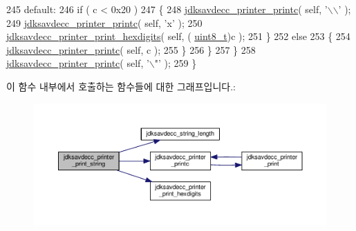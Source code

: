 \begin{DoxyCode}
245         \textcolor{keywordflow}{default}:
246             \textcolor{keywordflow}{if} ( c < 0x20 )
247             \{
248                 \hyperlink{group__util_ga24b25588730b43333c7b35cecc8f581d}{jdksavdecc\_printer\_printc}( \textcolor{keyword}{self}, \textcolor{charliteral}{'\(\backslash\)\(\backslash\)'} );
249                 \hyperlink{group__util_ga24b25588730b43333c7b35cecc8f581d}{jdksavdecc\_printer\_printc}( \textcolor{keyword}{self}, \textcolor{charliteral}{'x'} );
250                 \hyperlink{group__util_ga6ee1e417ed3ee0efc12d4ed87e38c405}{jdksavdecc\_printer\_print\_hexdigits}( \textcolor{keyword}{self}, (
      \hyperlink{stdint_8h_aba7bc1797add20fe3efdf37ced1182c5}{uint8\_t})c );
251             \}
252             \textcolor{keywordflow}{else}
253             \{
254                 \hyperlink{group__util_ga24b25588730b43333c7b35cecc8f581d}{jdksavdecc\_printer\_printc}( \textcolor{keyword}{self}, c );
255             \}
256         \}
257     \}
258     \hyperlink{group__util_ga24b25588730b43333c7b35cecc8f581d}{jdksavdecc\_printer\_printc}( \textcolor{keyword}{self}, \textcolor{charliteral}{'\(\backslash\)"'} );
259 \}
\end{DoxyCode}


이 함수 내부에서 호출하는 함수들에 대한 그래프입니다.\+:
\nopagebreak
\begin{figure}[H]
\begin{center}
\leavevmode
\includegraphics[width=350pt]{group__util_ga9ac55391c4d46889d21236f9255a79e7_cgraph}
\end{center}
\end{figure}




